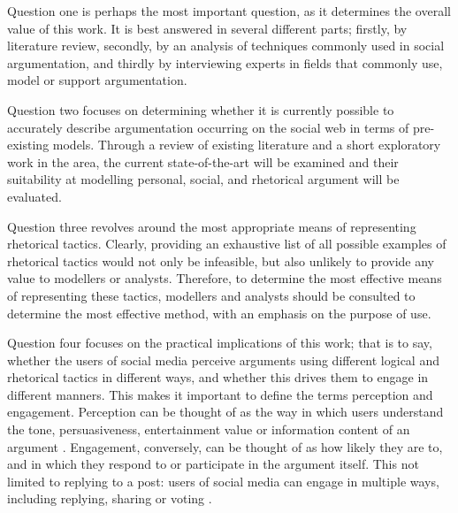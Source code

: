 Question one is perhaps the most important question, as it determines the overall value of this work. It is best answered in several different parts; firstly, by literature review, secondly, by an analysis of techniques commonly used in social argumentation, and thirdly by interviewing experts in fields that commonly use, model or support argumentation.

Question two focuses on determining whether it is currently possible to accurately describe argumentation occurring on the social web in terms of pre-existing models. Through a review of existing literature and a short exploratory work in the area, the current state-of-the-art will be examined and their suitability at modelling personal, social, and rhetorical argument will be evaluated.

Question three revolves around the most appropriate means of representing rhetorical tactics. Clearly, providing an exhaustive list of all possible examples of rhetorical tactics would not only be infeasible, but also unlikely to provide any value to modellers or analysts. Therefore, to determine the most effective means of representing these tactics, modellers and analysts should be consulted to determine the most effective method, with an emphasis on the purpose of use.

Question four focuses on the practical implications of this work; that is to say, whether the users of social media perceive arguments using different logical and rhetorical tactics in different ways, and whether this drives them to engage in different manners. This makes it important to define the terms perception and engagement. Perception can be thought of as the way in which users understand the tone, persuasiveness, entertainment value or information content of an argument \citep{sundar2000}. Engagement, conversely, can be thought of as how likely they are to, and in which they respond to or participate in the argument itself. This not limited to replying to a post: users of social media can engage in multiple ways, including replying, sharing or voting \citep{markova2013}.


